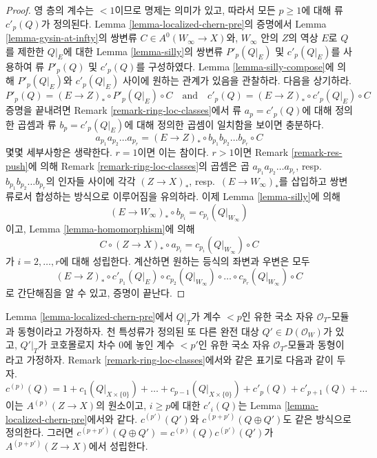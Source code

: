 \begin{proof}
영 층의 계수는 $< 1$이므로 명제는 의미가 있고, 따라서 모든
$p \geq 1$에 대해 류 $c'_p(Q)$가 정의된다. Lemma
\ref{lemma-localized-chern-pre}의 증명에서 Lemma
\ref{lemma-gysin-at-infty}의 쌍변류 $C \in A^0(W_\infty \to X)$와,
$W_\infty$ 안의 $Z$의 역상 $E$로 $Q$를 제한한 $Q|_E$에 대한 Lemma
\ref{lemma-silly}의 쌍변류 $P'_p(Q|_E)$ 및 $c'_p(Q|_E)$를 사용하여 류
$P'_p(Q)$ 및 $c'_p(Q)$를 구성하였다. Lemma
\ref{lemma-silly-compose}에 의해 $P'_p(Q|_E)$와 $c'_p(Q|_E)$ 사이에
원하는 관계가 있음을 관찰하라. 다음을 상기하라.
$$
P'_p(Q) = (E \to Z)_* \circ P'_p(Q|_E) \circ C
\quad\text{and}\quad
c'_p(Q) = (E \to Z)_* \circ c'_p(Q|_E) \circ C
$$
증명을 끝내려면 Remark \ref{remark-ring-loc-classes}에서 류
$a_p = c'_p(Q)$에 대해 정의한 곱셈과 류 $b_p = c'_p(Q|_E)$에 대해
정의한 곱셈이 일치함을 보이면 충분하다.
$$
a_{p_1}a_{p_2} \ldots a_{p_r} =
(E \to Z)_* \circ b_{p_1}b_{p_2} \ldots b_{p_r} \circ C
$$
몇몇 세부사항은 생략한다. $r = 1$이면 이는 참이다. $r > 1$이면
Remark \ref{remark-res-push}에 의해 Remark
\ref{remark-ring-loc-classes}의 곱셈은 곱
$a_{p_1}a_{p_2} \ldots a_{p_r}$, resp.\ $b_{p_1}b_{p_2} \ldots b_{p_r}$의
인자들 사이에 각각
$(Z \to X)_*$, resp.\ $(E \to W_\infty)_*$를 삽입하고 쌍변류로서
합성하는 방식으로 이루어짐을 유의하라. 이제 Lemma
\ref{lemma-silly}에 의해
$$
(E \to W_\infty)_* \circ b_{p_i} = c_{p_i}(Q|_{W_\infty})
$$
이고, Lemma \ref{lemma-homomorphism}에 의해
$$
C \circ (Z \to X)_* \circ a_{p_i} = c_{p_i}(Q|_{W_\infty}) \circ C
$$
가 $i = 2, \ldots, r$에 대해 성립한다. 계산하면 원하는 등식의
좌변과 우변은 모두
$$
(E \to Z)_* \circ c'_{p_1}(Q|_E) \circ
c_{p_2}(Q|_{W_\infty}) \circ \ldots \circ
c_{p_r}(Q|_{W_\infty}) \circ C
$$
로 간단해짐을 알 수 있고, 증명이 끝난다.
\end{proof}

\begin{lemma}
\label{lemma-localized-chern-pre-sum-c}
Lemma \ref{lemma-localized-chern-pre}에서 $Q|_T$가 계수 $< p$인 유한
국소 자유 $\mathcal{O}_T$-모듈과 동형이라고 가정하자. 천 특성류가
정의된 또 다른 완전 대상 $Q' \in D(\mathcal{O}_W)$가 있고,
$Q'|_T$가 코호몰로지 차수 $0$에 놓인 계수 $< p'$인 유한 국소 자유
$\mathcal{O}_T$-모듈과 동형이라고 가정하자. Remark
\ref{remark-ring-loc-classes}에서와 같은 표기로 다음과 같이 두자.
$$
c^{(p)}(Q) = 1 + c_1(Q|_{X \times \{0\}}) + \ldots +
c_{p - 1}(Q|_{X \times \{0\}}) +
c'_{p}(Q) + c'_{p + 1}(Q) + \ldots
$$
이는 $A^{(p)}(Z \to X)$의 원소이고, $i \geq p$에 대한 $c'_i(Q)$는
Lemma \ref{lemma-localized-chern-pre}에서와 같다. $c^{(p')}(Q')$와
$c^{(p + p')}(Q \oplus Q')$도 같은 방식으로 정의한다. 그러면
$c^{(p + p')}(Q \oplus Q') = c^{(p)}(Q)c^{(p')}(Q')$가
$A^{(p + p')}(Z \to X)$에서 성립한다.
\end{lemma}

